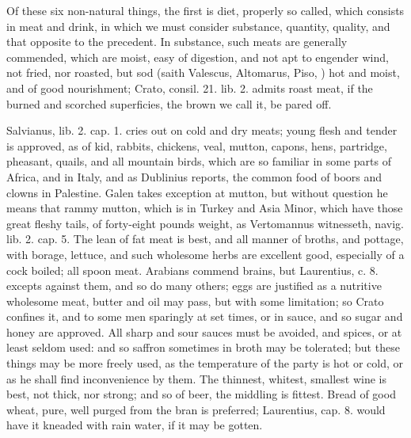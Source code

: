 {Of these six non-natural things, the first is diet, properly so called,
which consists in meat and drink, in which we must consider substance,
quantity, quality, and that opposite to the precedent. In substance,
such meats are generally commended, which are moist, easy of
digestion, and not apt to engender wind, not fried, nor roasted, but
sod (saith Valescus, Altomarus, Piso, \etc{}) hot and moist, and of good
nourishment; Crato, consil. 21. lib. 2. admits roast meat, if the
burned and scorched superficies, the brown we call it, be pared off.

Salvianus, lib. 2. cap. 1. cries out on cold and dry meats; young
flesh and tender is approved, as of kid, rabbits, chickens, veal,
mutton, capons, hens, partridge, pheasant, quails, and all mountain
birds, which are so familiar in some parts of Africa, and in Italy, and
as Dublinius reports, the common food of boors and clowns in
Palestine. Galen takes exception at mutton, but without question he
means that rammy mutton, which is in Turkey and Asia Minor, which have
those great fleshy tails, of forty-eight pounds weight, as Vertomannus
witnesseth, navig. lib. 2. cap. 5. The lean of fat meat is best, and
all manner of broths, and pottage, with borage, lettuce, and such
wholesome herbs are excellent good, especially of a cock boiled; all
spoon meat. Arabians commend brains, but Laurentius, c. 8.
excepts against them, and so do many others; eggs are justified
as a nutritive wholesome meat, butter and oil may pass, but with some
limitation; so Crato confines it, and to some men sparingly at
set times, or in sauce, and so sugar and honey are approved. All
sharp and sour sauces must be avoided, and spices, or at least seldom
used: and so saffron sometimes in broth may be tolerated; but these
things may be more freely used, as the temperature of the party is hot
or cold, or as he shall find inconvenience by them. The thinnest,
whitest, smallest wine is best, not thick, nor strong; and so of beer,
the middling is fittest. Bread of good wheat, pure, well purged from
the bran is preferred; Laurentius, cap. 8. would have it kneaded with
rain water, if it may be gotten.

}
